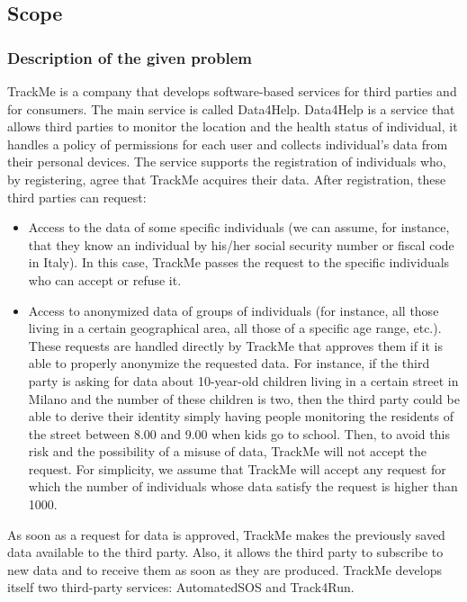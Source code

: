 \documentclass[a4paper]{article}
\begin{document}
\subsection{Scope}

\subsubsection{Description of the given problem}

TrackMe is a company that develops software-based services for third parties and for consumers. The main service is called Data4Help.
 Data4Help is a service that allows third parties to monitor the location and the health status of individual, it handles a policy of permissions for each user and collects individual’s data from their personal devices.
The service supports the registration of individuals who, by registering, agree that TrackMe acquires their data. After registration, these third parties can request:

\begin{itemize}
    \item Access to the data of some specific individuals (we can assume, for instance, that they know an 
    individual by his/her social security number or fiscal code in Italy). In this case, TrackMe passes 
    the request to the specific individuals who can accept or refuse it.
    
    \item Access to anonymized data of groups of individuals (for instance, all those living in a certain 
    geographical area, all those of a specific age range, etc.). These requests are handled directly 
    by TrackMe that approves them if it is able to properly anonymize the requested data. For 
    instance, if the third party is asking for data about 10-year-old children living in a certain street 
    in Milano and the number of these children is two, then the third party could be able to derive 
    their identity simply having people monitoring the residents of the street between 8.00 and 
    9.00 when kids go to school. Then, to avoid this risk and the possibility of a misuse of data,
    TrackMe will not accept the request. For simplicity, we assume that TrackMe will accept any 
    request for which the number of individuals whose data satisfy the request is higher than 
    1000.
\end{itemize}

As soon as a request for data is approved, TrackMe makes the previously saved data available to the 
third party. Also, it allows the third party to subscribe to new data and to receive them as soon as 
they are produced.
TrackMe develops itself two third-party services: AutomatedSOS and Track4Run.
\clearpage
\end{document}
